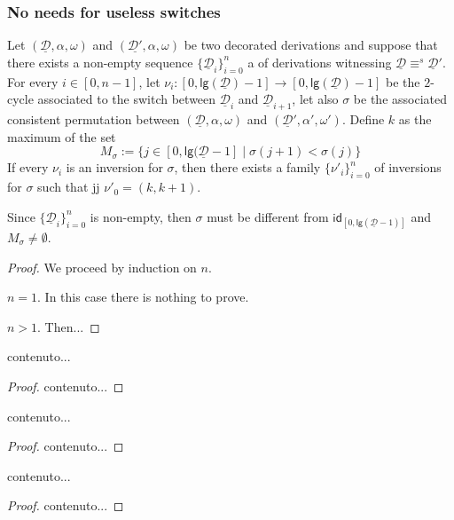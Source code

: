 \documentclass[a4paper,UKenglish,cleveref,pdftex, thm-restate,numberwithinsect]{lipics}
\newcommand{\id}[1]{\mathsf{id}_{#1}}
\newcommand{\dder}[1]{\mathscr{#1}}
\newcommand{\der}[1]{\underline{\dder{#1}}}
\newcommand{\lgh}[0]{\mathsf{lg}}
\begin{document}
\subsubsection{No needs for useless switches}

\begin{lemma} Let $(\der{D}, \alpha, \omega)$ and $(\der{D'}, \alpha, \omega)$ be two decorated derivations and suppose that there exists a non-empty sequence $\{\der{D}_i\}_{i=0}^n$ a of derivations witnessing $\der{D}\equiv^s \der{D}'$. For every $i\in [0,n-1]$, let $\nu_i\colon [0, \lgh(\der{D})-1]\to [0, \lgh(\der{D})-1]$ be the $2$-cycle associated to the switch between $\der{D}_i$ and $\der{D}_{i+1}$, let also $\sigma$ be the associated consistent permutation between $(\der{D}, \alpha, \omega)$ and $(\der{D}', \alpha', \omega')$. Define $k$ as the maximum of the set
\[M_\sigma:=\{j\in [0, \lgh(\der{D}-1] \mid \sigma(j+1) < \sigma(j) \}\]
If every $\nu_i$ is an inversion for $\sigma$, then there exists a family $\{\nu'_i\}_{i=0}^n$ of inversions for $\sigma$ such that jj $\nu'_0=(k, k+1)$.
\end{lemma}
\begin{remark}
	Since $\{\der{D}_i\}_{i=0}^n$ is non-empty, then $\sigma$ must be different from $\id{[0, \lgh(\der{D}-1)]}$ and $M_{\sigma}\neq \emptyset$.
\end{remark}
\begin{proof}
	We proceed by induction on $n$.
	
	\smallskip\noindent $n=1$. In this case there is nothing to prove.
	
	\smallskip \noindent $n>1$. Then...
\end{proof}

\begin{corollary}
	contenuto...
\end{corollary}
\begin{proof}
	contenuto...
\end{proof}


\begin{corollary}
	contenuto...
\end{corollary}
\begin{proof}
	contenuto...
\end{proof}



\begin{corollary}
	contenuto...
\end{corollary}
\begin{proof}
	contenuto...
\end{proof}
\end{document}
